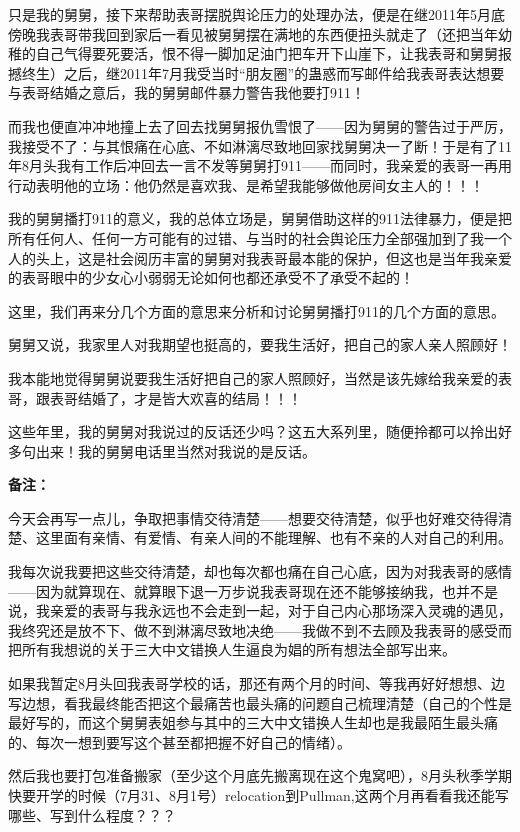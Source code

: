 \documentclass[9pt, b5paper]{article}
\begin{document}
只是我的舅舅，接下来帮助表哥摆脱舆论压力的处理办法，便是在继2011年5月底傍晚我表哥带我回到家后一看见被舅舅摆在满地的东西便扭头就走了（还把当年幼稚的自己气得要死要活，恨不得一脚加足油门把车开下山崖下，让我表哥和舅舅报撼终生）之后，继2011年7月我受当时“朋友圈”的蛊惑而写邮件给我表哥表达想要与表哥结婚之意后，我的舅舅邮件暴力警告我他要打911！

而我也便直冲冲地撞上去了回去找舅舅报仇雪恨了——因为舅舅的警告过于严厉，我接受不了：与其恨痛在心底、不如淋漓尽致地回家找舅舅决一了断！于是有了11年8月头我有工作后冲回去一言不发等舅舅打911——而同时，我亲爱的表哥一再用行动表明他的立场：他仍然是喜欢我、是希望我能够做他房间女主人的！！！

我的舅舅播打911的意义，我的总体立场是，舅舅借助这样的911法律暴力，便是把所有任何人、任何一方可能有的过错、与当时的社会舆论压力全部强加到了我一个人的头上，这是社会阅历丰富的舅舅对我表哥最本能的保护，但这也是当年我亲爱的表哥眼中的少女心小弱弱无论如何也都还承受不了承受不起的！

这里，我们再来分几个方面的意思来分析和讨论舅舅播打911的几个方面的意思。 

舅舅又说，我家里人对我期望也挺高的，要我生活好，把自己的家人亲人照顾好！

我本能地觉得舅舅说要我生活好把自己的家人照顾好，当然是该先嫁给我亲爱的表哥，跟表哥结婚了，才是皆大欢喜的结局！！！

这些年里，我的舅舅对我说过的反话还少吗？这五大系列里，随便拎都可以拎出好多句出来！我的舅舅电话里当然对我说的是反话。 

\textbf{备注：}

今天会再写一点儿，争取把事情交待清楚——想要交待清楚，似乎也好难交待得清楚、这里面有亲情、有爱情、有亲人间的不能理解、也有不亲的人对自己的利用。

我每次说我要把这些交待清楚，却也每次都也痛在自己心底，因为对我表哥的感情——因为就算现在、就算眼下退一万步说我表哥现在还不能够接纳我，也并不是说，我亲爱的表哥与我永远也不会走到一起，对于自己内心那场深入灵魂的遇见，我终究还是放不下、做不到淋漓尽致地决绝——我做不到不去顾及我表哥的感受而把所有我想说的关于三大中文错换人生逼良为娼的所有想法全部写出来。

如果我暂定8月头回我表哥学校的话，那还有两个月的时间、等我再好好想想、边写边想，看我最终能否把这个最痛苦也最头痛的问题自己梳理清楚（自己的个性是最好写的，而这个舅舅表姐参与其中的三大中文错换人生却也是我最陌生最头痛的、每次一想到要写这个甚至都把握不好自己的情绪）。

然后我也要打包准备搬家（至少这个月底先搬离现在这个鬼窝吧），8月头秋季学期快要开学的时候（7月31、8月1号）relocation到Pullman,这两个月再看看我还能写哪些、写到什么程度？？？
\end{document}

